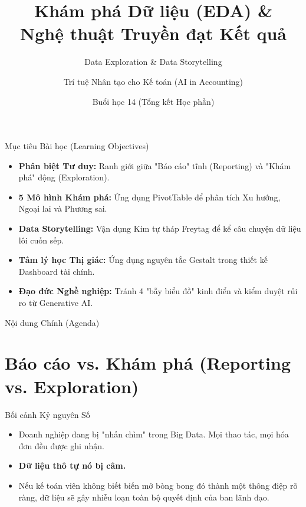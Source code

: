 \documentclass[aspectratio=169,12pt]{beamer}
\title[AI trong Kế toán - Buổi 14]{Khám phá Dữ liệu (EDA) \& \\ Nghệ thuật Truyền đạt Kết quả}
\subtitle{Data Exploration \& Data Storytelling}
\author[Giảng viên]{Trí tuệ Nhân tạo cho Kế toán (AI in Accounting)}
\institute[Đại học]{Khoa Kế toán - Kiểm toán}
\date{Buổi học 14 (Tổng kết Học phần)}
\begin{document}
\begin{frame}
    \titlepage
\end{frame}

\begin{frame}{Mục tiêu Bài học (Learning Objectives)}
    \begin{itemize}
        \item \textbf{Phân biệt Tư duy:} Ranh giới giữa "Báo cáo" tĩnh (Reporting) và "Khám phá" động (Exploration).
        \item \textbf{5 Mô hình Khám phá:} Ứng dụng PivotTable để phân tích Xu hướng, Ngoại lai và Phương sai.
        \item \textbf{Data Storytelling:} Vận dụng Kim tự tháp Freytag để kể câu chuyện dữ liệu lôi cuốn sếp.
        \item \textbf{Tâm lý học Thị giác:} Ứng dụng nguyên tắc Gestalt trong thiết kế Dashboard tài chính.
        \item \textbf{Đạo đức Nghề nghiệp:} Tránh 4 "bẫy biểu đồ" kinh điển và kiểm duyệt rủi ro từ Generative AI.
    \end{itemize}
\end{frame}

\begin{frame}{Nội dung Chính (Agenda)}
    \tableofcontents
\end{frame}

\section{Báo cáo vs. Khám phá (Reporting vs. Exploration)}
\begin{frame}
    \tableofcontents[currentsection]
\end{frame}

\begin{frame}{Bối cảnh Kỷ nguyên Số}
    \begin{itemize}
        \item Doanh nghiệp đang bị "nhấn chìm" trong Big Data. Mọi thao tác, mọi hóa đơn đều được ghi nhận.
        \item \textbf{Dữ liệu thô tự nó bị câm.}
        \item Nếu kế toán viên không biết biến mớ bòng bong đó thành một thông điệp rõ ràng, dữ liệu sẽ gây nhiễu loạn toàn bộ quyết định của ban lãnh đạo.
    \end{itemize}
\end{frame}
\end{document}
